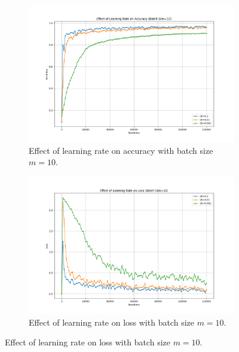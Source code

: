 \documentclass{article}
\begin{document}
\begin{figure}[H]
    \centering
    \begin{subfigure}[t]{0.48\textwidth}
        \vspace{0pt}%
        \centering
        \includegraphics[width=1.15\textwidth]{plots/part2a_learning_rate_accuracy.png}
        \caption{Effect of learning rate on accuracy with batch size $m=10$.}
        \label{fig:learning_rate_accuracy}
    \end{subfigure}
    \hfill
    \begin{subfigure}[t]{0.48\textwidth}
        \vspace{0pt}%

        \centering
        \includegraphics[width=1.15\textwidth]{plots/part2a_learning_rate_loss.png}
        \caption{Effect of learning rate on loss with batch size $m=10$.}
        \label{fig:learning_rate_loss}

    \end{subfigure}
\end{figure}
\end{document}
